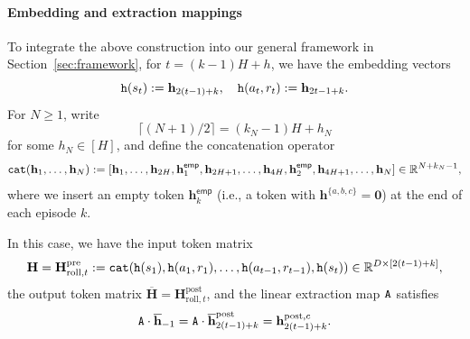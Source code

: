 \documentclass[10pt]{article}
\renewcommand{\bar}{\overline}
\newcommand{\<}{\left\langle}
\renewcommand{\>}{\right\rangle}
\newcommand{\bzero}{{\mathbf 0}}
\newcommand{\R}{\mathbb{R}}
\newcommand{\pre}{{\mathrm{pre}}}
\newcommand{\post}{{\mathrm{post}}}
\newcommand{\parta}{{a}}
\newcommand{\partb}{{b}}
\newcommand{\partc}{{c}}
\newcommand{\inst}{{\mathsf{M}}}
\newcommand{\state}{{s}}
\newcommand{\action}{{a}}
\newcommand{\reward}{{r}}
\newcommand{\cat}{{\tt cat}}
\newcommand{\extractmap}{{\tt A}}
\newcommand{\embedmap}{{\tt h}}
\newcommand{\horizon}{{H}}
\newcommand{\statesp}{{\mathcal{S}}}
\newcommand{\actionsp}{{\mathcal{A}}}
\renewcommand{\horizon}{{H}}
\newcommand{\transit}{{P}}
\newcommand{\rewardfun}{{R}}
\newcommand{\init}{{\mu_1}}
\newcommand{\roll}{{\mathrm{roll}}}
\newcommand{\Numst}{{S}}
\newcommand{\Numact}{{A}}
\newcommand{\emp}{{\mathsf{emp}}}
\def\bH{{\mathbf H}}
\def\bh{{\mathbf h}}
\begin{document}
\paragraph{Embedding and extraction mappings}
To integrate the above construction into our general framework in Section~\ref{sec:framework}, for $t=(k-1)\horizon+h$,  we have the embedding vectors $$\embedmap(\state_t):=\bh_{2(t-1)+k},~~~\embedmap(\action_t,\reward_t):=\bh_{2t-1+k}.$$  For $N\geq 1$, write $$\lceil(N+1)/2\rceil=(k_N-1)\horizon+h_N$$ for some $h_N\in[\horizon]$, and define the  concatenation operator 
\begin{align*}
\cat(\bh_1, \ldots, \bh_N): = [\bh_1, \ldots,\bh_{2\horizon},\bh_{1}^{\emp}, \bh_{2\horizon+1},\ldots,\bh_{4\horizon},\bh_2^\emp,\bh_{4\horizon+1},\ldots, \bh_N]\in\R^{N+k_N-1},
\end{align*}
where we insert an empty token $\bh_k^\emp$ (i.e., a token with $\bh^{\{\parta,\partb,\partc\}}=\bzero$) at the end of  each episode $k$. 

In this case, we have the input token matrix  $$\bH=\bH^\pre_{\roll,t}: = \cat(\embedmap(\state_1), \embedmap(\action_1, \reward_1), \ldots, \embedmap(\action_{t-1}, \reward_{t-1}), \embedmap(\state_t)) \in \R^{D \times [2(t-1)+k]},$$ the output token matrix $\bar{\bH}=\bH^\post_{\roll,t}$, and the linear extraction map $\extractmap$  satisfies $$\extractmap\cdot\bar{\bh}_{-1}=\extractmap\cdot\bar{\bh}^\post_{2(t-1)+k}=\bh^{\post,\partc}_{2(t-1)+k}.$$ 


















\end{document}
